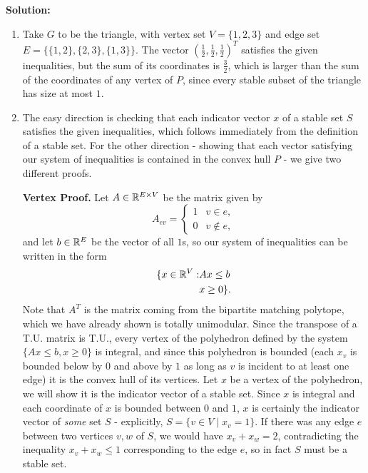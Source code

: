 \documentclass[12pt]{article}
\begin{document}
\begin{enumerate}
\textbf{Solution: }

\begin{enumerate}
\item
Take $G$ to be the triangle, with vertex set $V = \{1,2,3\}$ and edge set $E = \{\{1,2\}, \{2,3\}, \{1,3\}\}$. The vector $(\frac{1}{2}, \frac{1}{2}, \frac{1}{2})^T$ satisfies the given inequalities, but the sum of its coordinates is $\frac{3}{2}$, which is larger than the sum of the coordinates of any vertex of $P$, since every stable subset of the triangle has size at most $1$.

\item

The easy direction is checking that each indicator vector $x$ of a stable set $S$ satisfies the given inequalities, which follows immediately from the definition of a stable set. For the other direction - showing that each vector satisfying our system of inequalities is contained in the convex hull $P$ - we give two different proofs.

{\bf Vertex Proof.} Let $A \in {\mathbb R}^{E\times V}$ be the matrix given by
\[
A_{ev} = \begin{cases}1 & v \in e,\\ 0 & v\not\in e,\end{cases}
\]
and let $b \in {\mathbb R}^E$ be the vector of all $1$s, so our system of inequalities can be written in the form
\begin{eqnarray*}
\{x\in {\mathbb R}^{V}: &  Ax \le b \\
 &  x \geq 0\}.
\end{eqnarray*}
Note that $A^T$ is the matrix coming from the bipartite matching polytope, which we have already shown is totally unimodular. Since the transpose of a T.U. matrix is T.U., every vertex of the polyhedron defined by the system $\{Ax \le b, x \ge 0\}$ is integral, and since this polyhedron is bounded (each $x_v$ is bounded below by $0$ and above by $1$ as long as $v$ is incident to at least one edge) it is the convex hull of its vertices. Let $x$ be a vertex of the polyhedron, we will show it is the indicator vector of a stable set. Since $x$ is integral and each coordinate of $x$ is bounded between $0$ and $1$, $x$ is certainly the indicator vector of \emph{some} set $S$ - explicitly, $S = \{v \in V \mid x_v = 1\}$. If there was any edge $e$ between two vertices $v,w$ of $S$, we would have $x_v + x_w = 2$, contradicting the inequality $x_v + x_w \le 1$ corresponding to the edge $e$, so in fact $S$ must be a stable set.


\end{enumerate}
\end{enumerate}
\end{document}
